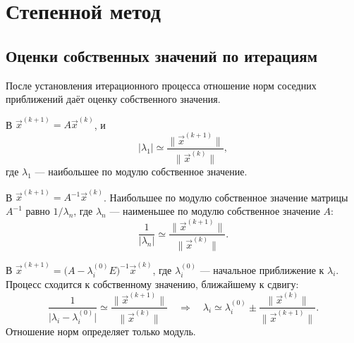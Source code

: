 \documentclass[../final.tex]{subfiles}
\begin{document}
\ifSubfilesClassLoaded{\setcounter{chapter}{6}\setcounter{section}{3}}{}
\captionsetup{font=footnotesize,labelfont=bf,skip=5pt}


\section{Степенной метод}

\subsection{Оценки собственных значений по итерациям}

После установления итерационного процесса отношение норм соседних
приближений даёт оценку собственного значения.

В  $\vec x^{(k+1)}=A\vec x^{(k)}$, и
\begin{equation*}
    |\lambda_1|\simeq\frac{\|\vec x^{(k+1)}\|}{\|\vec x^{(k)}\|},
\end{equation*}
где $\lambda_1$ --- наибольшее по модулю собственное значение.

В  $\vec x^{(k+1)}=A^{-1}\vec x^{(k)}$.
Наибольшее по модулю собственное значение матрицы $A^{-1}$ равно
$1/\lambda_n$, где $\lambda_n$ --- наименьшее по модулю
собственное значение $A$:
\begin{equation*}
    \frac{1}{|\lambda_n|}\simeq
    \frac{\|\vec x^{(k+1)}\|}{\|\vec x^{(k)}\|}.
\end{equation*}

В 
$\vec x^{(k+1)}=\bigl(A-\lambda_i^{(0)}E\bigr)^{-1}\vec x^{(k)}$,
где $\lambda_i^{(0)}$ --- начальное приближение к $\lambda_i$.
Процесс сходится к собственному значению, ближайшему к сдвигу:
\begin{equation*}
    \frac{1}{\bigl|\lambda_i-\lambda_i^{(0)}\bigr|}\simeq
    \frac{\|\vec x^{(k+1)}\|}{\|\vec x^{(k)}\|}
    \quad\Longrightarrow\quad
    \lambda_i\simeq\lambda_i^{(0)}\pm
    \frac{\|\vec x^{(k)}\|}{\|\vec x^{(k+1)}\|}.
\end{equation*}
Отношение норм определяет только модуль. 
\end{document}
